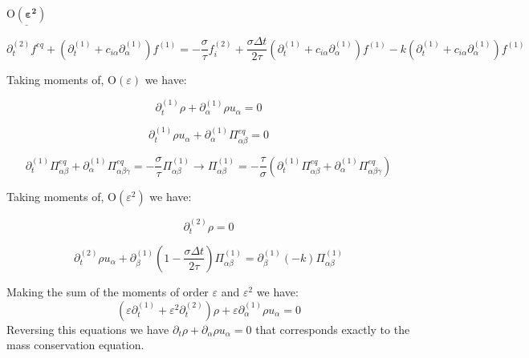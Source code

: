\documentclass{article}
\newcommand{\Omicron}{\mathrm{O}}
\begin{document}
$\underline{\boldsymbol{\Omicron ( \varepsilon^2 )}}$

\begin{equation*}
    \partial _{t}^{( 2)} f^{eq} +\left( \partial _{t}^{( 1)} +c_{i\alpha } \partial _{\alpha }^{( 1)}\right) f^{( 1)} =-\frac{\sigma}{\tau } f_{i}^{( 2)} +\frac{\sigma\Delta t}{2\tau }\left( \partial _{t}^{( 1)} +c_{i\alpha } \partial _{\alpha }^{( 1)}\right) f^{( 1)} -k\left( \partial _{t}^{( 1)} +c_{i\alpha } \partial _{\alpha }^{( 1)}\right) f^{( 1)}
\end{equation*}

Taking moments of, $\Omicron ( \varepsilon )$ we have:

\begin{equation*}
    \partial _{t}^{( 1)} \rho +\partial _{\alpha }^{( 1)} \rho u_{\alpha } =0
\end{equation*}

\begin{equation*}
    \partial _{t}^{( 1)} \rho u_{\alpha } +\partial _{\alpha }^{( 1)}\mathit{\Pi }_{\alpha \beta }^{eq} =0
\end{equation*}

\begin{equation*}
    \partial _{t}^{( 1)}\mathit{\Pi }_{\alpha \beta }^{eq} +\partial _{\alpha }^{( 1)}\mathit{\Pi }_{\alpha \beta \gamma }^{eq} =-\frac{\sigma}{\tau } \mathit{\Pi }_{\alpha \beta }^{( 1)}\rightarrow \mathit{\Pi }_{\alpha \beta }^{( 1)} =-\frac{\tau}{\sigma} \left( \partial _{t}^{( 1)}\mathit{\Pi }_{\alpha \beta }^{eq} +\partial _{\alpha }^{( 1)}\mathit{\Pi }_{\alpha \beta \gamma }^{eq}\right)
\end{equation*}

Taking moments of, $\Omicron ( \varepsilon^2 )$ we have: 

\begin{equation*}
    \partial _{t}^{( 2)} \rho =0
\end{equation*}

\begin{equation*}
    \partial _{t}^{( 2)} \rho u_{\alpha } +\partial _{\beta }^{( 1)}\left( 1-\frac{\sigma\Delta t}{2\tau }\right)\mathit{\Pi }_{\alpha \beta }^{( 1)} =\partial _{\beta }^{( 1)}( -k)\mathit{\Pi }_{\alpha \beta }^{( 1)}
\end{equation*}

Making the sum of the moments of order $\varepsilon$ and $\varepsilon^2$ we have:
\begin{equation*}
    \left( \varepsilon \partial _{t}^{( 1)} +\varepsilon ^{2} \partial _{t}^{( 2)}\right) \rho +\varepsilon \partial _{\alpha }^{( 1)} \rho u_{\alpha } =0
\end{equation*}
Reversing this equations we have $\partial _{t} \rho +\partial _{\alpha } \rho u_{\alpha } =0$ that corresponds exactly to the mass conservation equation.
\end{document}
